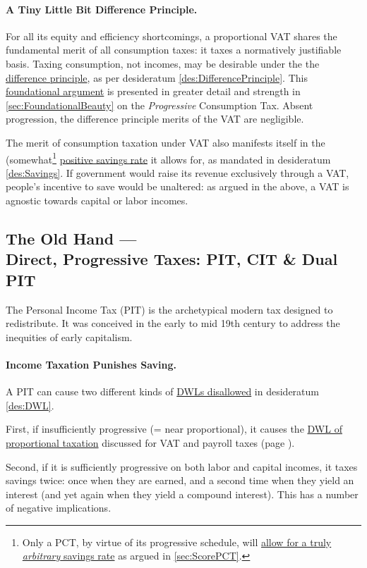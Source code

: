 \paragraph{A Tiny Little Bit Difference Principle.} For all its equity and efficiency shortcomings, a proportional VAT shares the fundamental merit of all consumption taxes: it taxes a normatively justifiable basis. Taxing consumption, not incomes, may be desirable under the the \hyperref[des:DifferencePrinciple]{difference principle}, as per desideratum \ref{des:DifferencePrinciple}. This \hyperref[sec:FoundationalBeauty]{foundational argument} is presented in greater detail and strength in \ref{sec:FoundationalBeauty} on the \emph{Progressive} Consumption Tax. Absent progression, the difference principle merits of the VAT are negligible.

The merit of consumption taxation under VAT also manifests itself in the (somewhat\footnote{
	Only a PCT, by virtue of its progressive schedule, will \hyperref[sec:ScorePCT]{allow for a truly \emph{arbitrary} savings rate} as argued in \autoref{sec:ScorePCT}.}
\hyperref[des:Savings]{positive savings rate} it allows for, as mandated in desideratum \ref{des:Savings}. If government would raise its revenue exclusively through a VAT, people's incentive to save would be unaltered: as argued in the above, a VAT is agnostic towards capital or labor incomes.

\subsection[Direct, Progressive Taxes]{The Old Hand ---\\Direct, Progressive Taxes: PIT, CIT \& Dual PIT} \label{sec:ScorePIT} The Personal Income Tax (PIT) is the archetypical modern tax designed to redistribute. It was conceived in the early to mid 19th century to address the inequities of early capitalism.

\paragraph{Income Taxation Punishes Saving.} A PIT can cause two different kinds of \hyperref[des:DWL]{DWLs disallowed} in desideratum \ref{des:DWL}.

First, if insufficiently progressive (= near proportional), it causes the \hyperref[sec:PropTaxDWL]{DWL of proportional taxation} discussed for VAT and payroll taxes (page \pageref{sec:PropTaxDWL}).

Second, if it is sufficiently progressive on both labor and capital incomes, it taxes savings twice: once when they are earned, and a second time when they yield an interest (and yet again when they yield a compound interest). This has a number of negative implications.

